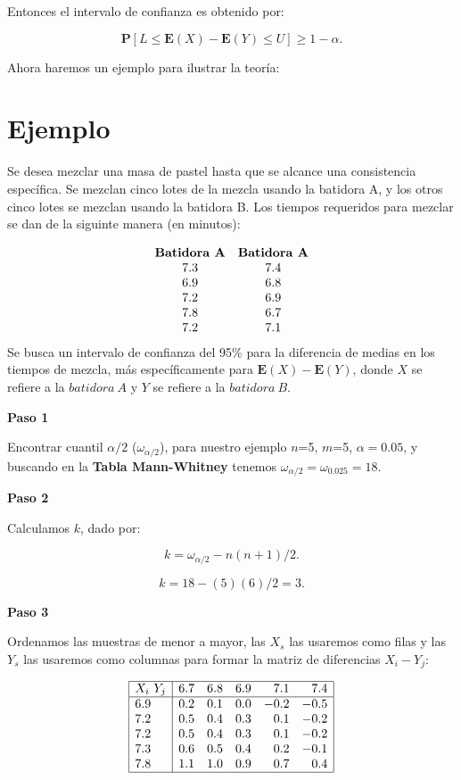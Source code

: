 \documentclass[
  a4paper,
  oneside,
  openany]{book}
\begin{document}
Entonces el intervalo de confianza es obtenido por:

\[\mathbf{P}[L\leq \mathbf{E}(X)-\mathbf{E}(Y)\leq U]\geq 1-\alpha.\]

Ahora haremos un ejemplo para ilustrar la teoría:

\hypertarget{ejemplo-6}{%
\section{Ejemplo}\label{ejemplo-6}}

Se desea mezclar una masa de pastel hasta que se alcance una consistencia específica. Se mezclan cinco lotes de la mezcla usando la batidora A, y los otros cinco lotes se mezclan usando la batidora B. Los tiempos requeridos para mezclar se dan de la siguinte manera (en minutos):

\[
\begin{array}{c c}
\textbf{Batidora A} & \textbf{Batidora A} \\
7.3 & 7.4 \\
6.9 & 6.8  \\
7.2 & 6.9 \\
7.8 & 6.7 \\
7.2 & 7.1 \\
\end{array}
\]
Se busca un intervalo de confianza del 95\% para la diferencia de medias en los tiempos de mezcla, más específicamente para \(\mathbf{E}(X)-\mathbf{E}(Y)\), donde \(X\) se refiere a la \(batidora\ A\) y \(Y\) se refiere a la \(batidora\ B\).

\textbf{Paso 1}

Encontrar cuantil \(\alpha/2\) (\(\omega_{\alpha/2}\)), para nuestro ejemplo \(n\)=5, \(m\)=5, \(\alpha=0.05\), y buscando en la \textbf{Tabla Mann-Whitney} tenemos \(\omega_{\alpha/2}=\omega_{0.025}=18.\)

\textbf{Paso 2}

Calculamos \(k\), dado por:

\[k= \omega_{\alpha/2}-n(n+1)/2.\]

\[k=18-(5)(6)/2=3.\]

\textbf{Paso 3}

Ordenamos las muestras de menor a mayor, las \(X_s\) las usaremos como filas y las \(Y_s\) las usaremos como columnas para formar la matriz de diferencias \(X_{i}-Y_{j}\):

\[
\begin{array}{|l| r r r r r|}
\hline
X_{i} \ Y_{j} & 6.7 & 6.8 & 6.9 & 7.1 & 7.4 \\
\hline
6.9 & 0.2 & 0.1 & 0.0 & -0.2 & -0.5 \\
7.2 & 0.5 & 0.4 & 0.3 &  0.1 & -0.2 \\
7.2 & 0.5 & 0.4 & 0.3 &  0.1 & -0.2 \\
7.3 & 0.6 & 0.5 & 0.4 &  0.2 & -0.1 \\
7.8 & 1.1 & 1.0 & 0.9 &  0.7 &  0.4 \\
\hline
\end{array}
\]
\end{document}
